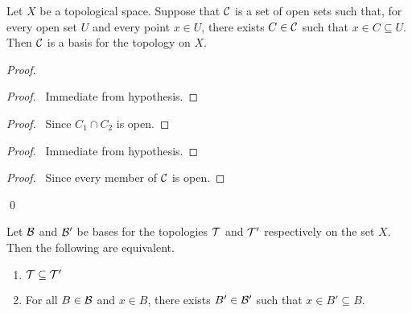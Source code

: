 \begin{lemma}
    \label{lemma:basis}
    Let $X$ be a topological space. Suppose that $\mathcal{C}$ is a set of open sets such that, for every open set $U$ and every point $x \in U$,
    there exists $C \in \mathcal{C}$ such that $x \in C \subseteq U$. Then $\mathcal{C}$ is a basis for the topology on $X$.
\end{lemma}

\begin{proof}
    \pf
    \begin{proof}
        \pf\ Immediate from hypothesis.
    \end{proof}
    \begin{proof}
        \pf\ Since $C_1 \cap C_2$ is open.
    \end{proof}
    \begin{proof}
        \pf\ Immediate from hypothesis.
    \end{proof}
    \begin{proof}
        \pf\ Since every member of $\mathcal{C}$ is open.
    \end{proof}
    \qed
\end{proof}

\begin{lemma}
    Let $\mathcal{B}$ and $\mathcal{B}'$ be bases for the topologies $\mathcal{T}$ and $\mathcal{T}'$ respectively on the set $X$. Then the following are equivalent.
    \begin{enumerate}
        \item $\mathcal{T} \subseteq \mathcal{T}'$
        \item For all $B \in \mathcal{B}$ and $x \in B$, there exists $B' \in \mathcal{B}'$ such that $x \in B' \subseteq B$.
    \end{enumerate}
\end{lemma}

